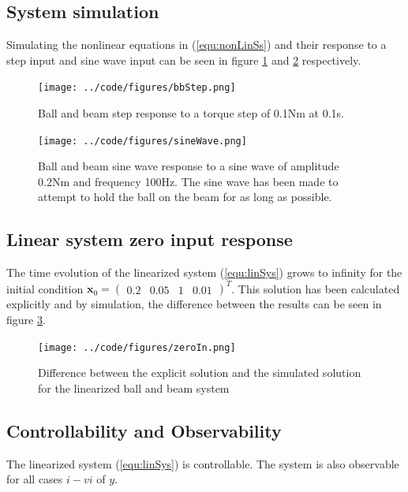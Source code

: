 \documentclass[a4paper, titlepage]{article}
\begin{document}
\subsection{System simulation}
Simulating the nonlinear equations in (\ref{equ:nonLinSs}) and their response to a step input and sine wave input can be seen in figure \ref{fig:bbStep} and \ref{fig:sineWave} respectively.

\begin{figure}[H]
\center
\texttt{[image: ../code/figures/bbStep.png]}
\caption{Ball and beam step response to a torque step of 0.1Nm at 0.1s.}
\label{fig:bbStep}
\end{figure}

\begin{figure}[H]
\center
\texttt{[image: ../code/figures/sineWave.png]}
\caption{Ball and beam sine wave response to a sine wave of amplitude 0.2Nm and frequency 100Hz. The sine wave has been made to attempt to hold the ball on the beam for as long as possible.}
\label{fig:sineWave}
\end{figure}

\subsection{Linear system zero input response}
The time evolution of the linearized system (\ref{equ:linSys}) grows to infinity for the initial condition $\textbf{x}_0 = \begin{pmatrix} 0.2 & 0.05 & 1 & 0.01 \end{pmatrix}^T$.
This solution has been calculated explicitly and by simulation, the difference between the results can be seen in figure \ref{fig:zeroIn}.

\begin{figure}[H]
\center
\texttt{[image: ../code/figures/zeroIn.png]}
\caption{Difference between the explicit solution and the simulated solution for the linearized ball and beam system}
\label{fig:zeroIn}
\end{figure}

\subsection{Controllability and Observability}
The linearized system (\ref{equ:linSys}) is controllable.
The system is also observable for all cases $i - vi$ of $y$.
\end{document}
